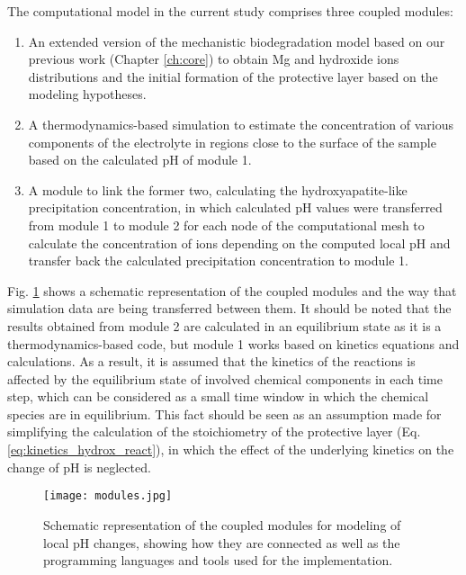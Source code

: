 The computational model in the current study comprises three coupled modules:
\begin{enumerate}
\item
An extended version of the mechanistic biodegradation model based on our previous work \cite{Barzegari2021} (Chapter \ref{ch:core}) to obtain Mg and hydroxide ions distributions and the initial formation of the protective layer based on the modeling hypotheses.
\item
A thermodynamics-based simulation to estimate the concentration of various components of the electrolyte in regions close to the surface of the sample based on the calculated pH of module 1.
\item
A module to link the former two, calculating the hydroxyapatite-like precipitation concentration, in which calculated pH values were transferred from module 1 to module 2 for each node of the computational mesh to calculate the concentration of ions depending on the computed local pH and transfer back the calculated precipitation concentration to module 1.
\end{enumerate}

Fig. \ref{fig:kinetics_modules} shows a schematic representation of the coupled modules and the way that simulation data are being transferred between them. It should be noted that the results obtained from module 2 are calculated in an equilibrium state as it is a thermodynamics-based code, but module 1 works based on kinetics equations and calculations. As a result, it is assumed that the kinetics of the reactions is affected by the equilibrium state of involved chemical components in each time step, which can be considered as a small time window in which the chemical species are in equilibrium. This fact should be seen as an assumption made for simplifying the calculation of the stoichiometry of the protective layer (Eq. \ref{eq:kinetics_hydrox_react}), in which the effect of the underlying kinetics on the change of pH is neglected.

\begin{figure}[h]
\centering
\medskip
\texttt{[image: modules.jpg]}
\caption[Schematic representation of the coupled modules for modeling of local pH changes]{Schematic representation of the coupled modules for modeling of local pH changes, showing how they are connected as well as the programming languages and tools used for the implementation.} \label{fig:kinetics_modules}
\end{figure}


